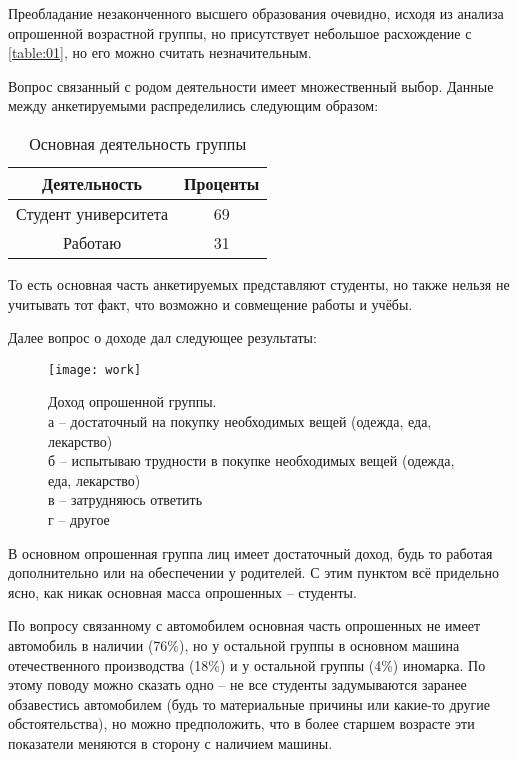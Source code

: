 Преобладание незаконченного высшего образования очевидно, исходя из анализа 
опрошенной возрастной группы, но присутствует небольшое расхождение с 
\ref{table:01}, но его можно считать незначительным.

Вопрос связанный с родом деятельности имеет множественный выбор. Данные между 
анкетируемыми распределились следующим образом:
\begin{table}[h!]
    \centering
    \begin{tabular}{|c|c|}
        \hline
        Деятельность & Проценты \\ \hline \hline
        Студент университета & 69 \\ \hline
        Работаю & 31 \\ \hline
    \end{tabular}
    \caption{Основная деятельность группы}
\end{table}

То есть основная часть анкетируемых представляют студенты, но также нельзя не 
учитывать тот факт, что возможно и совмещение работы и учёбы.

Далее вопрос о доходе дал следующее результаты:
\begin{figure}[h!]
    \centering
    \texttt{[image: work]} \\
    \caption{Доход опрошенной группы. \\
        а -- достаточный на покупку необходимых 
        вещей (одежда, еда, лекарство)\\
        б -- испытываю трудности в покупке 
        необходимых вещей (одежда, еда, лекарство)\\
        в -- затрудняюсь ответить \\
        г -- другое 
    }
\end{figure}

В основном опрошенная группа лиц имеет достаточный доход, будь то работая 
дополнительно или на обеспечении у родителей. С этим пунктом всё придельно 
ясно, как никак основная масса опрошенных -- студенты.

По вопросу связанному с автомобилем основная часть опрошенных не имеет 
автомобиль в наличии (76\%), но у остальной группы в основном машина 
отечественного производства (18\%) и у остальной группы (4\%) иномарка. 
По этому поводу можно сказать одно -- не все студенты задумываются заранее 
обзавестись автомобилем (будь то материальные причины или какие-то другие 
обстоятельства), но можно предположить, что в более старшем возрасте эти 
показатели меняются в сторону с наличием машины.

